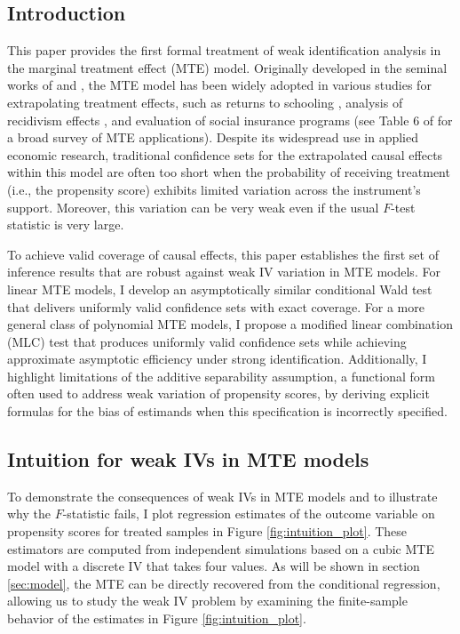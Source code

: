 \documentclass[11pt]{article}
\theoremstyle{definition}
\newcommand{\0}{\ensuremath{\mathbf{0}}}
\begin{document}
\begin{bibunit}
\section{Introduction}
This paper provides the first formal treatment of weak identification analysis in the marginal treatment effect (MTE) model. Originally developed in the seminal works of \cite{bjorklund/moffitt:1987} and \cite{heckman/vytlacil:1999, heckman/vytlacil:2001, heckman/vytlacil:2005}, the MTE model has been widely adopted in various studies for extrapolating treatment effects, such as returns to schooling \citep{moffitt:2008, carneiro/heckman/vytlacil:2011}, analysis of recidivism effects \citep{bhuller/dahl/loken/mogstad:2020, agan/doleac/harvey:2023}, and evaluation of social insurance programs \citep{maestas/mullen/strand:2013, aizawa/mommaerts/corina/rennane:2023} (see Table 6 of \cite{mogstad/torgovitsky:2024} for a broad survey of MTE applications). Despite its widespread use in applied economic research, traditional confidence sets for the extrapolated causal effects within this model are often too short when the probability of receiving treatment (i.e., the propensity score) exhibits limited variation across the instrument’s support. Moreover, this variation can be very weak even if the usual $F$-test statistic is very large.

To achieve valid coverage of causal effects, this paper establishes the first set of inference results that are robust against weak IV variation in MTE models. For linear MTE models, I develop an asymptotically similar conditional Wald test that delivers uniformly valid confidence sets with exact coverage. For a more general class of polynomial MTE models, I propose a modified linear combination (MLC) test that produces uniformly valid confidence sets while achieving approximate asymptotic efficiency under strong identification. Additionally, I highlight limitations of the additive separability assumption, a functional form often used to address weak variation of propensity scores, by deriving explicit formulas for the bias of estimands when this specification is incorrectly specified.

\subsection*{Intuition for weak IVs in MTE models}
To demonstrate the consequences of weak IVs in MTE models and to illustrate why the $F$-statistic fails, I plot regression estimates of the outcome variable on propensity scores for treated samples in Figure \ref{fig:intuition_plot}. These estimators are computed from independent simulations based on a cubic MTE model with a discrete IV that takes four values. As will be shown in section \ref{sec:model}, the MTE can be directly recovered from the conditional regression, allowing us to study the weak IV problem by examining the finite-sample behavior of the estimates in Figure \ref{fig:intuition_plot}.


\end{bibunit}
\end{document}
